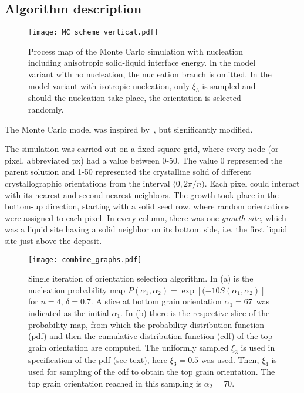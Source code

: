 \subsection{Algorithm description}
\begin{figure}
	\centering
	\texttt{[image: MC\_scheme\_vertical.pdf]}
	\caption{Process map of the Monte Carlo simulation with nucleation including anisotropic solid-liquid interface energy. In the model variant with no nucleation, the nucleation branch is omitted. In the model variant with isotropic nucleation, only $\xi_3$ is sampled and should the nucleation take place, the orientation is selected randomly.}
	\label{fig_MCscheme}
\end{figure}

The Monte Carlo model was inspired by~\cite{Li1997_1,Li1997_2}, but significantly modified. 

The simulation was carried out on a fixed square grid, where every node (or pixel, abbreviated px) had a value between 0-50. The value 0 represented the parent solution and 1-50 represented the crystalline solid of different crystallographic orientations from the interval $\langle0,2\pi/n)$. Each pixel could interact with its nearest and second nearest neighbors. The growth took place in the bottom-up direction, starting with a solid seed row, where random orientations were assigned to each pixel. In every column, there was one \textit{growth site}, which was a liquid site having a solid neighbor on its bottom side, i.e. the first liquid site just above the deposit.

\begin{figure*}
	\centering
	\texttt{[image: combine\_graphs.pdf]}
	\caption{Single iteration of orientation selection algorithm. In (a) is the nucleation probability map $P(\alpha_1,\alpha_2)=\exp[(-10S(\alpha_1,\alpha_2)]$ for $n=4$, $\delta=0.7$. A slice at bottom grain orientation $\alpha_1=67$\textdegree~was indicated as the initial $\alpha_1$. In (b) there is the respective slice of the probability map, from which the probability distribution function (pdf) and then the cumulative distribution function (cdf) of the top grain orientation are computed. The uniformly sampled $\xi_3$ is used in specification of the pdf (see text), here $\xi_3=0.5$ was used. Then, $\xi_4$ is used for sampling of the cdf to obtain the top grain orientation. The top grain orientation reached in this sampling is $\alpha_2=70$\textdegree.}
	\label{fig_MC_orientation_selection}
\end{figure*}

